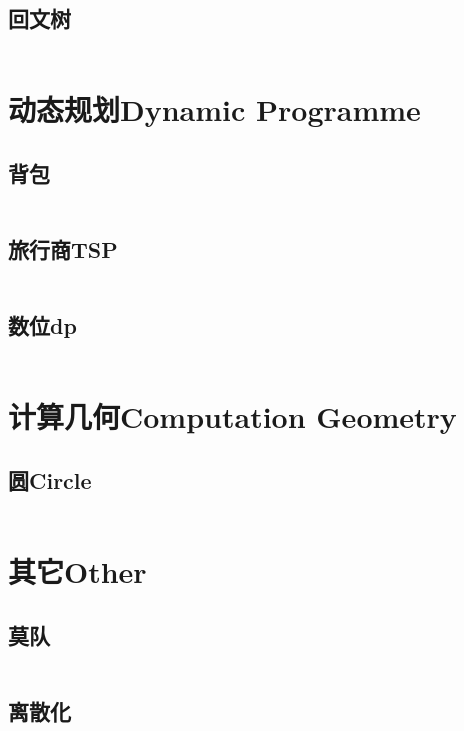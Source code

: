 \documentclass[twoside,sub3section,UTF8]{ctexart}						%
\begin{document}
	\subsection{回文树}
		\inputminted{c++}{"String/PAM.cpp"}
	
\section{动态规划Dynamic Programme}
	\subsection{背包}
		\inputminted{c++}{"Dynamic Programme/bag.cpp"}
	\subsection{旅行商TSP}
		\inputminted{c++}{"Dynamic Programme/TSP.cpp"}
	\subsection{数位dp}
		\inputminted{c++}{"Dynamic Programme/digit.cpp"}

\section{计算几何Computation Geometry}


	\subsection{圆Circle}
		\inputminted{c++}{"Computation Geometry/Circle/twopoint.cpp"}

\newpage
\section{其它Other}
	\subsection{莫队}
	\inputminted{c++}{"Other/Mos.cpp"}
	\subsection{离散化}
	\inputminted{c++}{"Other/discretization.cpp"}
\end{document}
